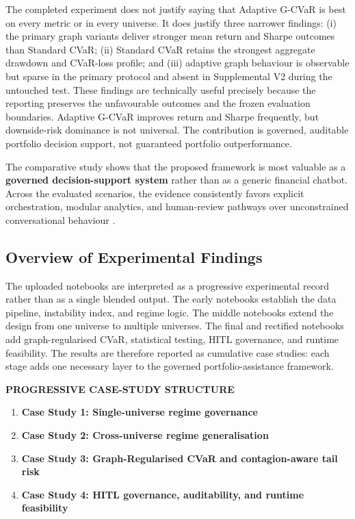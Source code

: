\documentclass[11pt]{article}
\begin{document}
The completed experiment does not justify saying that Adaptive G-CVaR is best on every metric or in every universe. It does justify three narrower findings: (i) the primary graph variants deliver stronger mean return and Sharpe outcomes than Standard CVaR; (ii) Standard CVaR retains the strongest aggregate drawdown and CVaR-loss profile; and (iii) adaptive graph behaviour is observable but sparse in the primary protocol and absent in Supplemental V2 during the untouched test. These findings are technically useful precisely because the reporting preserves the unfavourable outcomes and the frozen evaluation boundaries. Adaptive G-CVaR improves return and Sharpe frequently, but downside-risk dominance is not universal. The contribution is governed, auditable portfolio decision support, not guaranteed portfolio outperformance.

\iffalse

The comparative study shows that the proposed framework is most valuable as a \textbf{governed decision-support system} rather than as a generic financial chatbot. Across the evaluated scenarios, the evidence consistently favors explicit orchestration, modular analytics, and human-review pathways over unconstrained conversational behaviour \cite{wooldridge2009,holzinger2016,adadi2018,wu2023}.

\subsection{Overview of Experimental Findings}

The uploaded notebooks are interpreted as a progressive experimental record rather than as a single blended output. The early notebooks establish the data pipeline, instability index, and regime logic. The middle notebooks extend the design from one universe to multiple universes. The final and rectified notebooks add graph-regularised CVaR, statistical testing, HITL governance, and runtime feasibility. The results are therefore reported as cumulative case studies: each stage adds one necessary layer to the governed portfolio-assistance framework.

\begin{center}
\textcolor{resultgreen}{\Large\textbf{PROGRESSIVE CASE-STUDY STRUCTURE}}
\end{center}

\begin{enumerate}
  \item \textbf{Case Study 1: Single-universe regime governance}
  \item \textbf{Case Study 2: Cross-universe regime generalisation}
  \item \textbf{Case Study 3: Graph-Regularised CVaR and contagion-aware tail risk}
  \item \textbf{Case Study 4: HITL governance, auditability, and runtime feasibility}
\end{enumerate}
\end{document}
